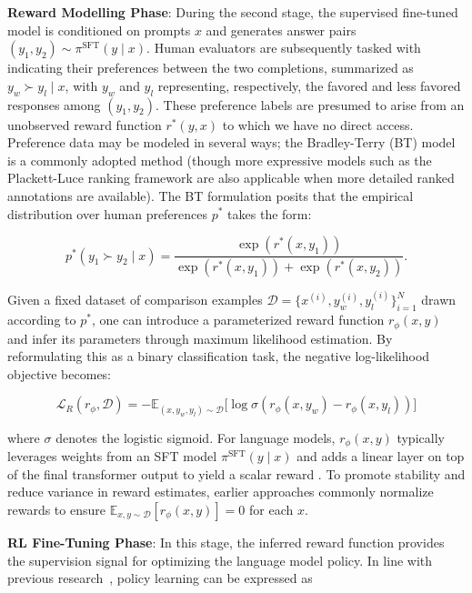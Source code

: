 \textbf{Reward Modelling Phase}: During the second stage, the supervised fine-tuned model is conditioned on prompts $x$ and generates answer pairs $(y_1, y_2) \sim \pi^\text{SFT}(y \mid x)$. Human evaluators are subsequently tasked with indicating their preferences between the two completions, summarized as $y_w\succ y_l \mid x$, with $y_w$ and $y_l$ representing, respectively, the favored and less favored responses among $(y_1, y_2)$. These preference labels are presumed to arise from an unobserved reward function $r^*(y, x)$ to which we have no direct access. Preference data may be modeled in several ways; the Bradley-Terry (BT) model \cite{bradley1952rankanalysis} is a commonly adopted method (though more expressive models such as the Plackett-Luce ranking framework \citep{plackett1975analysis, luce2012individual} are also applicable when more detailed ranked annotations are available). The BT formulation posits that the empirical distribution over human preferences $p^*$ takes the form:

\begin{equation}\label{eq:bradley-terry}
    p^*(y_1\succ y_2 \mid x)=\frac{\exp\left(r^*(x, y_1)\right)}{\exp\left(r^*(x, y_1)\right) + \exp\left(r^*(x, y_2)\right)}.
\end{equation}

Given a fixed dataset of comparison examples $\mathcal{D}=\bigl\{x^{(i)}, y_w^{(i)}, y_l^{(i)}\bigr\}_{i=1}^N$ drawn according to $p^*$, one can introduce a parameterized reward function $r_{\phi}(x, y)$ and infer its parameters through maximum likelihood estimation. By reformulating this as a binary classification task, the negative log-likelihood objective becomes:

\begin{equation}\label{eq:reward_model}
    \mathcal{L}_R(r_{\phi}, \mathcal{D}) = -\mathbb{E}_{(x, y_w, y_l)\sim \mathcal{D}}\bigl[\log \sigma(r_{\phi}(x, y_w)- r_{\phi}(x, y_l))\bigr]
\end{equation}

where $\sigma$ denotes the logistic sigmoid. For language models, $r_{\phi}(x, y)$ typically leverages weights from an SFT model $\pi^\text{SFT}(y \mid x)$ and adds a linear layer on top of the final transformer output to yield a scalar reward \cite{ziegler2020finetuning}. To promote stability and reduce variance in reward estimates, earlier approaches commonly normalize rewards to ensure $\mathbb{E}_{x,y\sim \mathcal{D}}\left[r_\phi(x, y)\right] = 0$ for each $x$.

\textbf{RL Fine-Tuning Phase}: In this stage, the inferred reward function provides the supervision signal for optimizing the language model policy. In line with previous research~\citep{jaques2017sequence, jaques2020human}, policy learning can be expressed as

